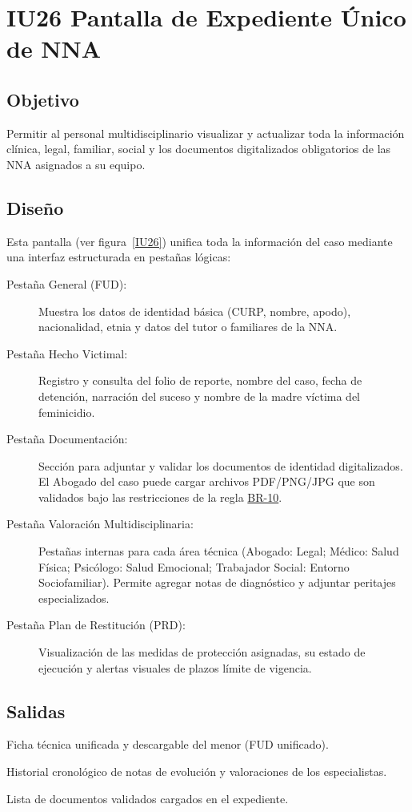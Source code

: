 \section{IU26 Pantalla de Expediente Único de NNA}

\subsection{Objetivo}
	Permitir al personal multidisciplinario visualizar y actualizar toda la información clínica, legal, familiar, social y los documentos digitalizados obligatorios de las NNA asignados a su equipo.

\subsection{Diseño}
	Esta pantalla  (ver figura~\ref{IU26}) unifica toda la información del caso mediante una interfaz estructurada en pestañas lógicas:
	\begin{description}
		\item[Pestaña General (FUD):] Muestra los datos de identidad básica (CURP, nombre, apodo), nacionalidad, etnia y datos del tutor o familiares de la NNA.
		\item[Pestaña Hecho Victimal:] Registro y consulta del folio de reporte, nombre del caso, fecha de detención, narración del suceso y nombre de la madre víctima del feminicidio.
		\item[Pestaña Documentación:] Sección para adjuntar y validar los documentos de identidad digitalizados. El Abogado del caso puede cargar archivos PDF/PNG/JPG que son validados bajo las restricciones de la regla \hyperlink{BR-10}{BR-10}.
		\item[Pestaña Valoración Multidisciplinaria:] Pestañas internas para cada área técnica (Abogado: Legal; Médico: Salud Física; Psicólogo: Salud Emocional; Trabajador Social: Entorno Sociofamiliar). Permite agregar notas de diagnóstico y adjuntar peritajes especializados.
		\item[Pestaña Plan de Restitución (PRD):] Visualización de las medidas de protección asignadas, su estado de ejecución y alertas visuales de plazos límite de vigencia.
	\end{description}


\subsection{Salidas}
	\begin{Citemize}
		\item Ficha técnica unificada y descargable del menor (FUD unificado).
		\item Historial cronológico de notas de evolución y valoraciones de los especialistas.
		\item Lista de documentos validados cargados en el expediente.
	\end{Citemize}

